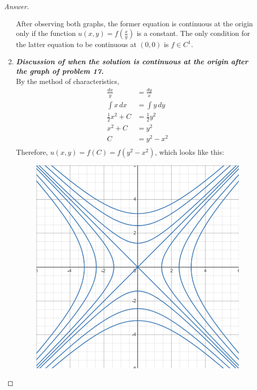 \documentclass{article}
\theoremstyle{definition}
\renewcommand\qedsymbol{$\blacksquare$}
\newenvironment{ans}{\begin{proof}[Answer]\renewcommand{\qedsymbol}{}}{\end{proof}}
\begin{document}
\begin{ans}
\begin{enumerate}[resume*=answers]
\begin{figure}[H]
                    \end{figure}

                After observing both graphs, the former equation is continuous at the origin only if the function $u(x,y) = f(\frac{x}{y})$ is a constant. The only condition for the latter equation to be continuous at $(0,0)$ is $f \in C^1$.
			
			\item \textbf{\emph{Discussion of when the solution is continuous at the origin after the graph of problem 17.}}\\
            By the method of characteristics,
            \begin{align*}
                \frac{dx}{y} &= \frac{dy}{x}\\
                \int x\,dx &= \int y\,dy\\
                \frac{1}{2}x^2 + C &= \frac{1}{2}y^2\\
                x^2 + C &= y^2\\
                C &= y^2 - x^2\\
            \end{align*}
			Therefore, $u(x,y) = f(C) = f(y^2 - x^2)$, which looks like this:\\
            \begin{figure}[H]
                \centering
                \includegraphics[width=2.3 in]{16 graph.png}
            \end{figure}
            

\end{enumerate}
\end{ans}
\end{document}
